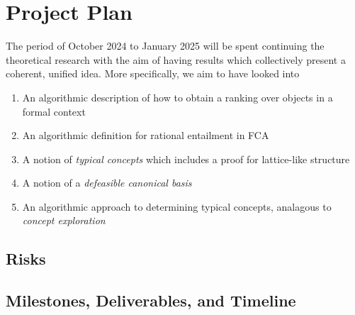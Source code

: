 \clearpage
\section{Project Plan}
\label{section: project plan}
The period of October 2024 to January 2025 will be spent continuing the theoretical research with the aim of having results which collectively present a coherent, unified idea. More specifically, we aim to have looked into
\begin{enumerate}
    \item An algorithmic description of how to obtain a ranking over objects in a formal context
    \item An algorithmic definition for rational entailment in FCA
    \item A notion of \emph{typical concepts} which includes a proof for lattice-like structure
    \item A notion of a \emph{defeasible canonical basis}
    \item An algorithmic approach to determining typical concepts, analagous to \emph{concept exploration}
\end{enumerate}
\subsection{Risks}
\label{subsection: risks}

\subsection{Milestones, Deliverables, and Timeline}
\label{Deliverables and Timeline}

\clearpage
\onecolumn
